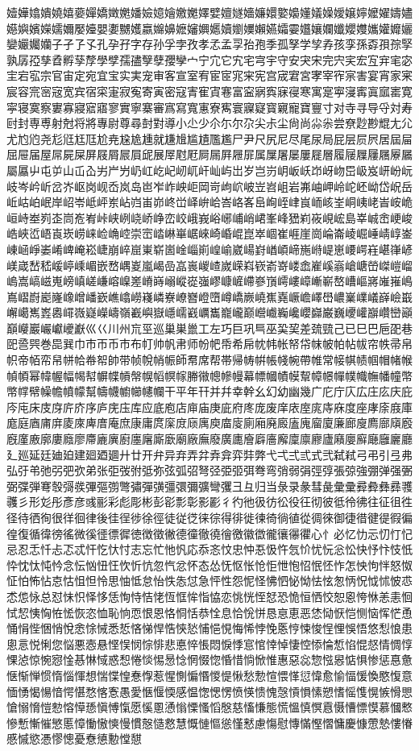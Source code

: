 嬄嬅嬆嬇嬈嬉嬊嬋嬌嬍嬎嬏嬐嬑嬒嬓嬔嬕嬖嬗嬘嬙嬚嬛嬜嬝嬞嬟嬠嬡嬢嬣嬤嬥嬦嬧嬨嬩嬪嬫嬬嬭嬮嬯嬰嬱嬲嬳嬴嬵嬶嬷嬸嬹嬺嬻嬼嬽嬾嬿孀孁孂孃孄孅孆孇孈孉孊孋孌孍孎孏子孑孒孓孔孕孖字存孙孚孛孜孝孞孟孠孡孢季孤孥学孧孨孩孪孫孬孭孮孯孰孱孲孳孴孵孶孷學孹孺孻孼孽孾孿宀宁宂它宄宅宆宇守安宊宋完宍宎宏宐宑宒宓宔宕宖宗官宙定宛宜宝实実宠审客宣室宥宦宧宨宩宪宫宬宭宮宯宰宱宲害宴宵家宷宸容宺宻宼宽宾宿寀寁寂寃寄寅密寇寈寉寊寋富寍寎寏寐寑寒寓寔寕寖寗寘寙寚寛寜寝寞察寠寡寢寣寤寥實寧寨審寪寫寬寭寮寯寰寱寲寳寴寵寶寷寸对寺寻导寽対寿尀封専尃射尅将將專尉尊尋尌對導小尐少尒尓尔尕尖尗尘尙尚尛尜尝尞尟尠尡尢尣尤尥尦尧尨尩尪尫尬尭尮尯尰就尲尳尴尵尶尷尸尹尺尻尼尽尾尿局屁层屃屄居屆屇屈屉届屋屌屍屎屏屐屑屒屓屔展屖屗屘屙屚屛屜屝属屟屠屡屢屣層履屦屧屨屩屪屫屬屭屮屯屰山屲屳屴屵屶屷屸屹屺屻屼屽屾屿岀岁岂岃岄岅岆岇岈岉岊岋岌岍岎岏岐岑岒岓岔岕岖岗岘岙岚岛岜岝岞岟岠岡岢岣岤岥岦岧岨岩岪岫岬岭岮岯岰岱岲岳岴岵岶岷岸岹岺岻岼岽岾岿峀峁峂峃峄峅峆峇峈峉峊峋峌峍峎峏峐峑峒峓峔峕峖峗峘峙峚峛峜峝峞峟峠峡峢峣峤峥峦峧峨峩峪峫峬峭峮峯峰峱峲峳峴峵島峷峸峹峺峻峼峽峾峿崀崁崂崃崄崅崆崇崈崉崊崋崌崍崎崏崐崑崒崓崔崕崖崗崘崙崚崛崜崝崞崟崠崡崢崣崤崥崦崧崨崩崪崫崬崭崮崯崰崱崲崳崴崵崶崷崸崹崺崻崼崽崾崿嵀嵁嵂嵃嵄嵅嵆嵇嵈嵉嵊嵋嵌嵍嵎嵏嵐嵑嵒嵓嵔嵕嵖嵗嵘嵙嵚嵛嵜嵝嵞嵟嵠嵡嵢嵣嵤嵥嵦嵧嵨嵩嵪嵫嵬嵭嵮嵯嵰嵱嵲嵳嵴嵵嵶嵷嵸嵹嵺嵻嵼嵽嵾嵿嶀嶁嶂嶃嶄嶅嶆嶇嶈嶉嶊嶋嶌嶍嶎嶏嶐嶑嶒嶓嶔嶕嶖嶗嶘嶙嶚嶛嶜嶝嶞嶟嶠嶡嶢嶣嶤嶥嶦嶧嶨嶩嶪嶫嶬嶭嶮嶯嶰嶱嶲嶳嶴嶵嶶嶷嶸嶹嶺嶻嶼嶽嶾嶿巀巁巂巃巄巅巆巇巈巉巊巋巌巍巎巏巐巑巒巓巔巕巖巗巘巙巚巛巜川州巟巠巡巢巣巤工左巧巨巩巪巫巬巭差巯巰己已巳巴巵巶巷巸巹巺巻巼巽巾巿帀币市布帄帅帆帇师帉帊帋希帍帎帏帐帑帒帓帔帕帖帗帘帙帚帛帜帝帞帟帠帡帢帣帤帥带帧帨帩帪師帬席帮帯帰帱帲帳帴帵帶帷常帹帺帻帼帽帾帿幀幁幂幃幄幅幆幇幈幉幊幋幌幍幎幏幐幑幒幓幔幕幖幗幘幙幚幛幜幝幞幟幠幡幢幣幤幥幦幧幨幩幪幫幬幭幮幯幰幱干平年幵并幷幸幹幺幻幼幽幾广庀庁庂広庄庅庆庇庈庉床庋庌庍庎序庐庑庒库应底庖店庘庙庚庛府庝庞废庠庡庢庣庤庥度座庨庩庪庫庬庭庮庯庰庱庲庳庴庵庶康庸庹庺庻庼庽庾庿廀廁廂廃廄廅廆廇廈廉廊廋廌廍廎廏廐廑廒廓廔廕廖廗廘廙廚廛廜廝廞廟廠廡廢廣廤廥廦廧廨廩廪廫廬廭廮廯廰廱廲廳廴廵延廷廸廹建廻廼廽廾廿开弁异弃弄弅弆弇弈弉弊弋弌弍弎式弐弑弒弓弔引弖弗弘弙弚弛弜弝弞弟张弡弢弣弤弥弦弧弨弩弪弫弬弭弮弯弰弱弲弳弴張弶強弸弹强弻弼弽弾弿彀彁彂彃彄彅彆彇彈彉彊彋彌彍彎彏彐彑归当彔录彖彗彘彙彚彛彜彝彞彟彠彡形彣彤彥彦彧彨彩彪彫彬彭彮彯彰影彲彳彴彵彶彷彸役彺彻彼彽彾彿往征徂徃径待徆徇很徉徊律後徍徎徏徐徑徒従徔徕徖得徘徙徚徛徜徝從徟徠御徢徣徤徥徦徧徨復循徫徬徭微徯徰徱徲徳徴徵徶德徸徹徺徻徼徽徾徿忀忁忂心忄必忆忇忈忉忊忋忌忍忎忏忐忑忒忓忔忕忖志忘忙忚忛応忝忞忟忠忡忢忣忤忥忦忧忨忩忪快忬忭忮忯忰忱忲忳忴念忶忷忸忹忺忻忼忽忾忿怀态怂怃怄怅怆怇怈怉怊怋怌怍怎怏怐怑怒怓怔怕怖怗怘怙怚怛怜思怞怟怠怡怢怣怤急怦性怨怩怪怫怬怭怮怯怰怱怲怳怴怵怶怷怸怹怺总怼怽怾怿恀恁恂恃恄恅恆恇恈恉恊恋恌恍恎恏恐恑恒恓恔恕恖恗恘恙恚恛恜恝恞恟恠恡恢恣恤恥恦恧恨恩恪恫恬恭恮息恰恱恲恳恴恵恶恷恸恹恺恻恼恽恾恿悀悁悂悃悄悅悆悇悈悉悊悋悌悍悎悏悐悑悒悓悔悕悖悗悘悙悚悛悜悝悞悟悠悡悢患悤悥悦悧您悩悪悫悬悭悮悯悰悱悲悳悴悵悶悷悸悹悺悻悼悽悾悿惀惁惂惃惄情惆惇惈惉惊惋惌惍惎惏惐惑惒惓惔惕惖惗惘惙惚惛惜惝惞惟惠惡惢惣惤惥惦惧惨惩惪惫惬惭惮惯惰惱惲想惴惵惶惷惸惹惺惻惼惽惾惿愀愁愂愃愄愅愆愇愈愉愊愋愌愍愎意愐愑愒愓愔愕愖愗愘愙愚愛愜愝愞感愠愡愢愣愤愥愦愧愨愩愪愫愬愭愮愯愰愱愲愳愴愵愶愷愸愹愺愻愼愽愾愿慀慁慂慃慄慅慆慇慈慉慊態慌慍慎慏慐慑慒慓慔慕慖慗慘慙慚慛慜慝慞慟慠慡慢慣慤慥慦慧慨慩慪慫慬慭慮慯慰慱慲慳慴慵慶慷慸慹慺慻慼慽慾慿憀憁憂憃憄憅憆憇